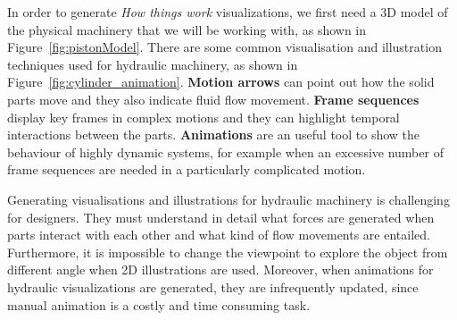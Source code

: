 In order to generate \textit{How things work} visualizations, we first need a 3D model of the physical machinery that we will be working with, as shown in Figure~\ref{fig:pistonModel}.
There are some common visualisation and illustration techniques used for hydraulic machinery, as shown in Figure~\ref{fig:cylinder_animation}.
\textbf{Motion arrows} can point out how the solid parts move and they also indicate fluid flow movement.
\textbf{Frame sequences} display key frames in complex motions and they can highlight temporal interactions between the parts.
\textbf{Animations} are an useful tool to show the behaviour of highly dynamic systems, for example when an excessive number of frame sequences are needed in a particularly complicated motion.

Generating visualisations and illustrations for hydraulic machinery is challenging for designers.
They must understand in detail what forces are generated when parts interact with each other and what kind of flow movements are entailed.
Furthermore, it is impossible to change the viewpoint to explore the object from different angle when 2D illustrations are used.
Moreover, when animations for hydraulic visualizations are generated, they are infrequently updated, since manual animation is a costly and time consuming task.


